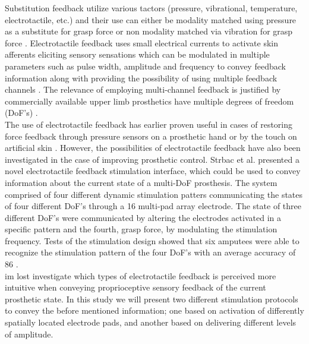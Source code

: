 Substitution feedback utilize various tactors (pressure, vibrational, temperature, electrotactile, etc.) and their use can either be modality matched using pressure as a substitute for grasp force \cite{Godfrey2017} or non modality matched via vibration for grasp force \cite{Ninu2014,Nabeel2016}. 
Electrotactile feedback uses small electrical currents to activate skin afferents eliciting sensory sensations which can be modulated in multiple parameters such as pulse width, amplitude and frequency to convey feedback information along with providing the possibility of using multiple feedback channels \cite{Geng2012}. The relevance of employing multi-channel feedback is justified by commercially available upper limb prosthetics have multiple degrees of freedom (DoF's) \cite{Cordella2016}. \\
%
The use of electrotactile feedback has earlier proven useful in cases of restoring force feedback through pressure sensors on a prosthetic hand or by the touch on artificial skin \cite{Hartmann2014,Franceschi2015}. However, the possibilities of electrotactile feedback have also been investigated in the case of improving prosthetic control. Strbac et al. \cite{Strbac2016} presented a novel electrotactile feedback stimulation interface, which could be used to convey information about the current state of a multi-DoF prosthesis. The system comprised of four different dynamic stimulation patters communicating the states of four different DoF's through a 16 multi-pad array electrode. The state of three different DoF's were communicated by altering the electrodes activated in a specific pattern and the fourth, grasp force, by modulating the stimulation frequency. Tests of the stimulation design showed that six amputees were able to recognize the stimulation pattern of the four DoF's with an average accuracy of 86 \percent. \cite{Strbac2016} \\   
%
im lost investigate which types of electrotactile feedback is perceived more intuitive when conveying proprioceptive sensory feedback of the current prosthetic state. In this study we will present two different stimulation protocols to convey the before mentioned information; one based on activation of differently spatially located electrode pads, and another based on delivering different levels of amplitude.      


 
